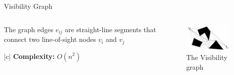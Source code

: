 \documentclass[handout]{beamer}
\newcommand\Tstrut{\rule{0pt}{2.6ex}}       %
\newcommand\Bstrut{\rule[-0.9ex]{0pt}{0pt}} %
\newcommand{\TBstrut}{\Tstrut\Bstrut} %
\begin{document}
  \begin{frame}{Visibility Graph}

    \begin{columns}
      \begin{column}[]{0.4\textwidth}
        The graph edges $e_{ij}$ are straight-line segments that connect two line-of-sight nodes $v_{i}$ and $v_{j}$

        \centering
        \begin{table}
          \begin{tblr}{|c|}
            \hline
            \textbf{Complexity:} $O(n^{2})$ \TBstrut\\
            \hline
          \end{tblr}
        \end{table}
        
      \end{column}
      \begin{column}[]{0.6\textwidth}
        \begin{center}
        \begin{figure}
          \includegraphics[width=60mm]{fig/fig_03_visibility_graph.png}
          \caption{The Visibility graph}
          \label{fig:fig03}
        \end{figure}
       \end{center}
      \end{column}
    \end{columns}
    
  \end{frame}
\end{document}
